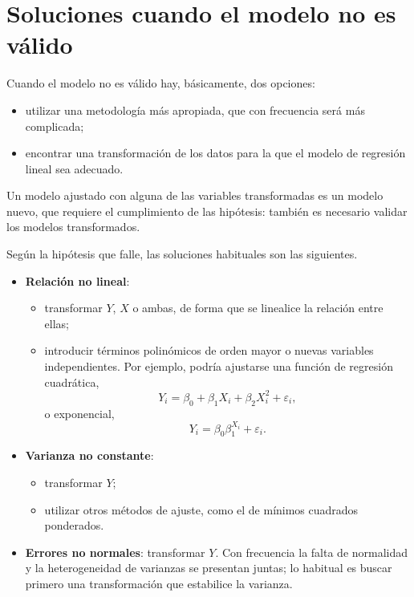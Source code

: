 \section{Soluciones cuando el modelo no es válido}
\label{sec:t4-soluciones}

Cuando el modelo no es válido hay, básicamente, dos opciones:
\begin{itemize}
  \item utilizar una metodología más apropiada, que con frecuencia será más complicada;
  \item encontrar una transformación de los datos para la que el modelo de regresión lineal sea
    adecuado.
\end{itemize}
Un modelo ajustado con alguna de las variables transformadas es un modelo nuevo, que requiere
el cumplimiento de las hipótesis: también es necesario validar los modelos transformados.

Según la hipótesis que falle, las soluciones habituales son las siguientes.
\begin{itemize}
  \item \textbf{Relación no lineal}:
    \begin{itemize}
      \item transformar $Y$, $X$ o ambas, de forma que se linealice la relación entre ellas;
      \item introducir términos polinómicos de orden mayor o nuevas variables independientes.
        Por ejemplo, podría ajustarse una función de regresión cuadrática,
        \[
          Y_i = \beta_0+\beta_1X_i+\beta_2X_i^2+\varepsilon_i ,
        \]
        o exponencial,
        \[
          Y_i = \beta_0\beta_1^{X_i}+\varepsilon_i .
        \]
    \end{itemize}
  \item \textbf{Varianza no constante}:
    \begin{itemize}
      \item transformar $Y$;
      \item utilizar otros métodos de ajuste, como el de mínimos cuadrados ponderados.
    \end{itemize}
  \item \textbf{Errores no normales}: transformar $Y$. Con frecuencia la falta de normalidad y la
    heterogeneidad de varianzas se presentan juntas; lo habitual es buscar primero una
    transformación que estabilice la varianza.
\end{itemize}

